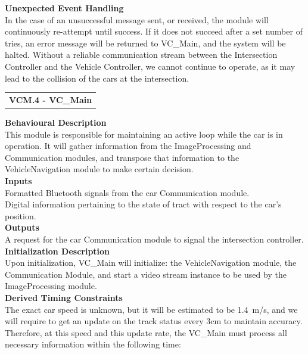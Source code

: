 \documentclass [10pt]{article}
\newcommand{\carSpeed}{1.4\ m/s}
\begin{document}
\textbf{Unexpected Event Handling} \\
In the case of an unsuccessful message sent, or received, the module will continuously re-attempt until success. If it does not succeed after a set number of tries, an error message will be returned to VC\_Main, and the system will be halted. Without a reliable communication stream between the Intersection Controller and the Vehicle Controller, we cannot continue to operate, as it may lead to the collision of the cars at the intersection. \\


\begin{longtable}{p{}}
\rowcolor{tableCell}\textbf{VCM.4 - VC\_Main} \\
\end{longtable}

\textbf{Behavioural Description} \\
This module is responsible for maintaining an active loop while the car is in operation. It will gather information from the ImageProcessing and Communication modules, and transpose that information to the VehicleNavigation module to make certain decision. \\


\textbf{Inputs} \\
Formatted Bluetooth signals from the car Communication module. \\
Digital information pertaining to the state of tract with respect to the car's position. \\

\textbf{Outputs}\\
A request for the car Communication module to signal the intersection controller. \\

\textbf{Initialization Description} \\
Upon initialization, VC\_Main will initialize: the VehicleNavigation module,  the Communication Module, and start a video stream instance to be used by the ImageProcessing module. \\

\textbf{Derived Timing Constraints} \\
The exact car speed is unknown, but it will be estimated to be \carSpeed, and we will require to get an update on the track status every 3cm to maintain accuracy. Therefore, at this speed and this update rate, the VC\_Main must process all necessary information within the following time:
\end{document}
